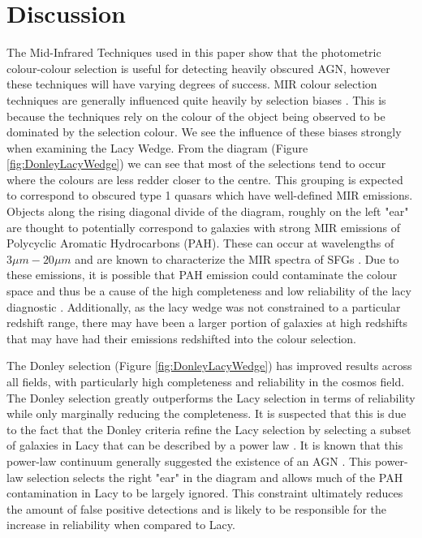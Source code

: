 \documentclass[11pt]{iopart}
\begin{document}
\section{Discussion}
The Mid-Infrared Techniques used in this paper show that the photometric colour-colour selection is useful for detecting heavily obscured AGN, however these techniques will have varying degrees of success. MIR colour selection techniques are generally influenced quite heavily by selection biases \cite{lacy_optical_2007}. This is because the techniques rely on the colour of the object being observed to be dominated by the selection colour. We see the influence of these biases strongly when examining the Lacy Wedge. From the diagram (Figure \ref{fig:DonleyLacyWedge}) we can see that most of the selections tend to occur where the colours are less redder closer to the centre. This grouping is expected to correspond to obscured type 1 quasars which have well-defined MIR emissions\cite{lacy_optical_2007}. Objects along the rising diagonal divide of the diagram, roughly on the left "ear" are thought to potentially correspond to galaxies with strong MIR emissions of Polycyclic Aromatic Hydrocarbons (PAH)\cite{lacy_optical_2007, sajina_simulating_2005}. These can occur at wavelengths of $3\mu m-20\mu m$ and are known to characterize the MIR spectra of SFGs \cite{langeroodi_pah_2023}. Due to these emissions, it is possible that PAH emission could contaminate the colour space and thus be a cause of the high completeness and low reliability of the lacy diagnostic \cite{hickox_obscured_2018}. Additionally, as the lacy wedge was not constrained to a particular redshift range, there may have been a larger portion of galaxies at high redshifts that may have had their emissions redshifted into the colour selection. \par The Donley selection (Figure \ref{fig:DonleyLacyWedge}) has improved results across all fields, with particularly high completeness and reliability in the cosmos field. The Donley selection greatly outperforms the Lacy selection in terms of reliability while only marginally reducing the completeness. It is suspected that this is due to the fact that the Donley criteria refine the Lacy selection by selecting a subset of galaxies in Lacy that can be described by a power law \cite{donley_identifying_2012, alonsoherrero_infrared_2006}. It is known that this power-law continuum generally suggested the existence of an AGN \cite{elvis_atlas_1994}. This power-law selection selects the right "ear" in the diagram and allows much of the PAH contamination in Lacy to be largely ignored. This constraint ultimately reduces the amount of false positive detections and is likely to be responsible for the increase in reliability when compared to Lacy. \par 
\end{document}
